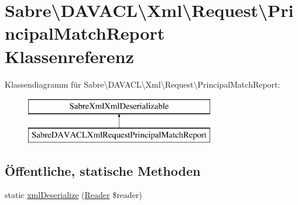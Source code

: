 \hypertarget{class_sabre_1_1_d_a_v_a_c_l_1_1_xml_1_1_request_1_1_principal_match_report}{}\section{Sabre\textbackslash{}D\+A\+V\+A\+CL\textbackslash{}Xml\textbackslash{}Request\textbackslash{}Principal\+Match\+Report Klassenreferenz}
\label{class_sabre_1_1_d_a_v_a_c_l_1_1_xml_1_1_request_1_1_principal_match_report}
Klassendiagramm für Sabre\textbackslash{}D\+A\+V\+A\+CL\textbackslash{}Xml\textbackslash{}Request\textbackslash{}Principal\+Match\+Report\+:\begin{figure}[H]
\begin{center}
\leavevmode
\includegraphics[height=2.000000cm]{class_sabre_1_1_d_a_v_a_c_l_1_1_xml_1_1_request_1_1_principal_match_report}
\end{center}
\end{figure}
\subsection*{Öffentliche, statische Methoden}
\begin{DoxyCompactItemize}
\item 
static \mbox{\hyperlink{class_sabre_1_1_d_a_v_a_c_l_1_1_xml_1_1_request_1_1_principal_match_report_a128e85bc1d7c68e4496f49158891edaf}{xml\+Deserialize}} (\mbox{\hyperlink{class_sabre_1_1_xml_1_1_reader}{Reader}} \$reader)
\end{DoxyCompactItemize}
